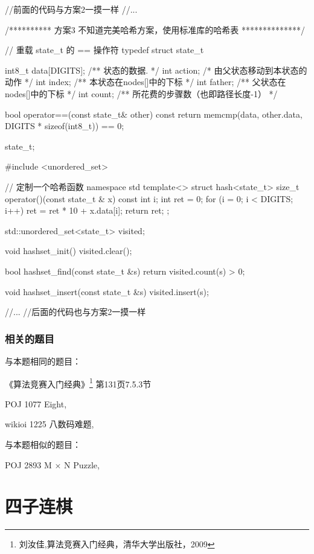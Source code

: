 \begin{Codex}[label=eight_digits_bfs3.cpp]
//前面的代码与方案2一摸一样
//...

/********** 方案3 不知道完美哈希方案，使用标准库的哈希表 **************/

// 重载 state_t 的 == 操作符
typedef struct state_t {
    int8_t data[DIGITS];  /** 状态的数据. */
    int action; /* 由父状态移动到本状态的动作 */
    int index;  /** 本状态在nodes[]中的下标 */
    int father; /** 父状态在nodes[]中的下标 */
    int count;  /** 所花费的步骤数（也即路径长度-1） */

    bool operator==(const state_t& other) const {
        return memcmp(data, other.data, DIGITS * sizeof(int8_t)) == 0;
    }
} state_t;

#include <unordered_set>

// 定制一个哈希函数
namespace std {
template<> struct hash<state_t> {
    size_t operator()(const state_t & x) const {
        int i;
        int ret = 0;
        for (i = 0; i < DIGITS; i++)
            ret = ret * 10 + x.data[i];
        return ret;
    }
};
}

std::unordered_set<state_t> visited;

void hashset_init() {
    visited.clear();
}

bool hashset_find(const state_t &s) {
    return visited.count(s) > 0;
}

void hashset_insert(const state_t &s) {
    visited.insert(s);
}

//...
//后面的代码也与方案2一摸一样
\end{Codex}

\subsubsection{相关的题目}
与本题相同的题目：
\begindot
\item 《算法竞赛入门经典》\footnote{刘汝佳,算法竞赛入门经典，清华大学出版社，2009} 第131页7.5.3节
\item  POJ 1077 Eight, 
\item  wikioi 1225 八数码难题, 
\myenddot

与本题相似的题目：
\begindot
\item  POJ 2893 M × N Puzzle, 
\myenddot


\section{四子连棋} %

